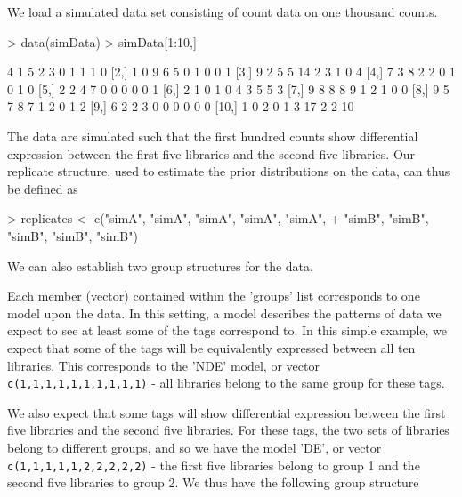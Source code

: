 \documentclass[a4paper]{article}
\begin{document}
We load a simulated data set consisting of count data on one thousand counts.

\begin{Schunk}
\begin{Sinput}
> data(simData)
> simData[1:10,]
\end{Sinput}
\begin{Soutput}
      [,1] [,2] [,3] [,4] [,5] [,6] [,7] [,8] [,9] [,10]
 [1,]    4    1    5    2    3    0    1    1    1     0
 [2,]    1    0    9    6    5    0    1    0    0     1
 [3,]    9    2    5    5   14    2    3    1    0     4
 [4,]    7    3    8    2    2    0    1    0    1     0
 [5,]    2    2    4    7    0    0    0    0    0     1
 [6,]    2    1    0    1    0    4    3    5    5     3
 [7,]    9    8    8    8    9    1    2    1    0     0
 [8,]    9    5    7    8    7    1    2    0    1     2
 [9,]    6    2    2    3    0    0    0    0    0     0
[10,]    1    0    2    0    1    3   17    2    2    10
\end{Soutput}
\end{Schunk}

The data are simulated such that the first hundred counts show differential expression between the first five libraries and the second five libraries. Our replicate structure, used to estimate the prior distributions on the data, can thus be defined as
\begin{Schunk}
\begin{Sinput}
>   replicates <- c("simA", "simA", "simA", "simA", "simA",
+                   "simB", "simB", "simB", "simB", "simB")
\end{Sinput}
\end{Schunk}

We can also establish two group structures for the data.

Each member (vector) contained within the 'groups' list corresponds to one model upon the data. In this setting, a model describes the patterns of data we expect to see at least some of the tags correspond to. In this simple example, we expect that some of the tags will be equivalently expressed between all ten libraries. This corresponds to the 'NDE' model, or vector \verb'c(1,1,1,1,1,1,1,1,1,1)' - all libraries belong to the same group for these tags. 

We also expect that some tags will show differential expression between the first five libraries and the second five libraries. For these tags, the two sets of libraries belong to different groups, and so we have the model 'DE', or vector \verb'c(1,1,1,1,1,2,2,2,2,2)' - the first five libraries belong to group 1 and the second five libraries to group 2. We thus have the following group structure
\end{document}

